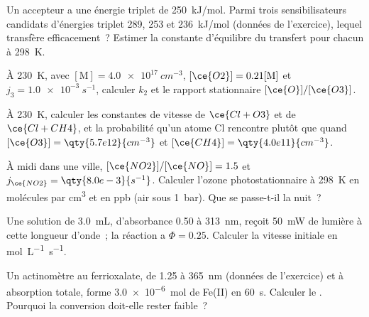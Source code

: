 \begin{exercise}[$\star\star$]\label{exo:b3:photochemistry:7}
Un accepteur a une énergie triplet de \qty{250}{kJ/mol}. Parmi trois
sensibilisateurs candidats d'énergies triplet 289, 253 et
\qty{236}{kJ/mol} (données de l'exercice), lequel transfère
efficacement~? Estimer la constante d'équilibre du transfert pour chacun
à \qty{298}{K}.
\end{exercise}

\begin{exercise}[$\star\star$]\label{exo:b3:photochemistry:8}
À \qty{230}{K}, avec $[\mathrm M] = \qty{4.0e17}{cm^{-3}}$, $[\ce{O2}] = 0.21[\mathrm M]$ et $j_3 = \qty{1.0e-3}{s^{-1}}$,
calculer $k_2$ et le rapport stationnaire $[\ce{O}]/[\ce{O3}]$.
\end{exercise}

\begin{exercise}[$\star\star$]\label{exo:b3:photochemistry:9}
À \qty{230}{K}, calculer les constantes de vitesse de $\ce{Cl + O3}$ et de
$\ce{Cl + CH4}$, et la probabilité qu'un atome Cl rencontre 
plutôt que  quand $[\ce{O3}] = \qty{5.7e12}{cm^{-3}}$
et $[\ce{CH4}] = \qty{4.0e11}{cm^{-3}}$.
\end{exercise}

\begin{exercise}[$\star\star\star$]\label{exo:b3:photochemistry:10}
À midi dans une ville, $[\ce{NO2}]/[\ce{NO}] = 1.5$ et $j_{\ce{NO2}} = \qty{8.0e-3}{s^{-1}}$.
Calculer l'ozone photostationnaire à \qty{298}{K} en molécules par
\unit{cm^3} et en ppb (air sous \qty{1}{bar}).
Que se passe-t-il la nuit~?
\end{exercise}

\begin{exercise}[$\star\star\star$]\label{exo:b3:photochemistry:11}
Une solution de \qty{3.0}{mL}, d'absorbance 0.50 à \qty{313}{nm}, reçoit
\qty{50}{mW} de lumière à cette longueur d'onde~; la réaction a
$\Phi = 0.25$. Calculer la vitesse initiale en
\unit{mol.L^{-1}.s^{-1}}.
\end{exercise}

\begin{exercise}[$\star\star\star$]\label{exo:b3:photochemistry:12}
Un actinomètre au ferrioxalate, de  1.25 à
\qty{365}{nm} (données de l'exercice) et à absorption totale, forme
\qty{3.0e-6}{mol} de Fe(II) en \qty{60}{s}.
Calculer le . Pourquoi la conversion doit-elle rester
faible~?
\end{exercise}

